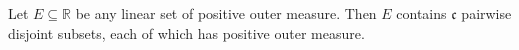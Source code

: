 Let $E \subseteq \mathbb{R}$ be any linear set of positive outer measure. Then $E$ contains $\mathfrak{c}$ pairwise disjoint subsets, each of which has positive outer measure.
